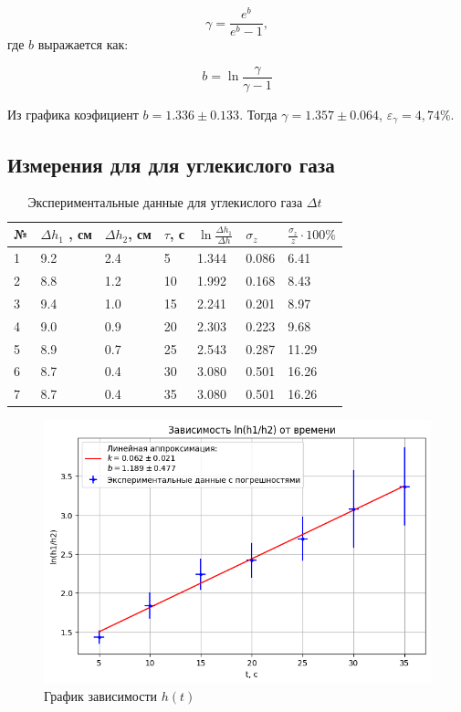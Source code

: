 \documentclass[a4paper,12pt]{article}
\begin{document}
\[
\gamma = \frac{e^b}{e^b - 1},
\]
где \(b\) выражается как:

\[
b = \ln{\frac{\gamma}{\gamma - 1}}
\]

Из графика коэфициент $b = 1.336 \pm 0.133$. Тогда $\gamma = 1.357 \pm 0.064$, $\varepsilon_{\gamma} = 4,74 \%$. 


\subsection{Измерения для для углекислого газа}

\begin{table}[h!]
    \caption{Экспериментальные данные для углекислого газа $\Delta t$}
    \begin{center}
    \begin{tabular}{|l|l|l|l|l|l|l|}
        \hline
        № & $\Delta h_1$ , см & $\Delta h_2$, см & $\tau$, с & $\ln{\frac{\Delta h_1}{\Delta h}}$ & $\sigma_z$ & $\frac{\sigma_z}{z} \cdot 100\%$ \\\hline
        1 & 9.2 & 2.4 & 5  & 1.344 & 0.086 & 6.41 \\\hline
        2 & 8.8 & 1.2 & 10 & 1.992 & 0.168 & 8.43 \\\hline
        3 & 9.4 & 1.0 & 15 & 2.241 & 0.201 & 8.97 \\\hline
        4 & 9.0 & 0.9 & 20 & 2.303 & 0.223 & 9.68 \\\hline
        5 & 8.9 & 0.7 & 25 & 2.543 & 0.287 & 11.29 \\\hline 
        6 & 8.7 & 0.4 & 30 & 3.080 & 0.501 & 16.26 \\\hline
        7 & 8.7 & 0.4 & 35 & 3.080 & 0.501 & 16.26 \\\hline
    \end{tabular}
    \end{center}
\end{table}

\begin{figure}[h!] %
    \centering
    \includegraphics[width=0.9\linewidth]{3.png} %
    \caption{График зависимости $h(t)$}
    \label{plan2} %
\end{figure}
\end{document}
